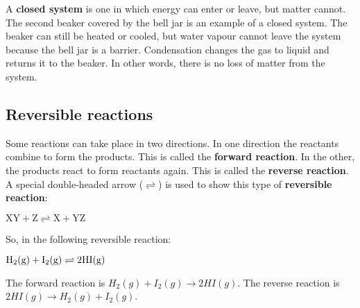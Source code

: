 A \textbf{closed system} is one in which energy can enter or leave, but matter cannot. The second beaker covered by the bell jar is an example of a closed system. The beaker can still be heated or cooled, but water vapour cannot leave the system because the bell jar is a barrier. Condensation changes the gas to liquid and returns it to the beaker. In other words, there is no loss of matter from the system. \\


\subsection{Reversible reactions}
Some reactions can take place in two directions. In one direction the reactants combine to form the products. This is called the \textbf{forward reaction}. In the other, the products react to form reactants again. This is called the \textbf{reverse reaction}. A special double-headed arrow ($\rightleftharpoons$) is used to show this type of \textbf{reversible reaction}:

\begin{center}
$ \text{XY} + \text{Z} \rightleftharpoons \text{X} + \text{YZ} $
\end{center}

So, in the following reversible reaction:
\begin{center}
$\rm{H_{2}(g) + I_{2}(g) \rightleftharpoons 2HI (g)}$
\end{center}

The forward reaction is ${H_{2}(g) + I_{2}(g) \rightarrow 2HI(g)}$. The reverse reaction is ${2HI(g) \rightarrow H_{2}(g) + I_{2}(g)}$.


